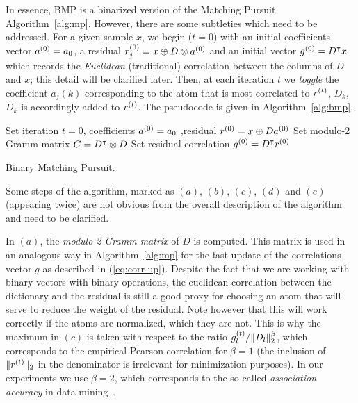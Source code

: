 \documentclass[twocolumn]{IEEEtran}
\theoremstyle{definition}
\def\transp{^\intercal}
\newcommand{\refeq}[1]{(\ref{#1})}
\begin{document}
In essence, BMP is a binarized version of the Matching Pursuit Algorithm~\ref{alg:mp}. However, there are some subtleties which need to be addressed. 
For a given sample $x$, we begin ($t=0$) with an initial coefficients vector $a^{(0)}=a_0$, a residual $r^{(0)}_j=x \oplus D \otimes a^{(0)}$ and an initial vector $g\iter{0}=D\transp x$ which records the \emph{Euclidean} (traditional)  correlation between the columns of $D$ and $x$; this detail will be clarified later. Then, at each iteration $t$ we \emph{toggle} the coefficient $a_j(k)$ corresponding to the atom that is most correlated to $r^{(t)}$, $D_{k}$, $D_k$ is accordingly added to $r^{(t)}$. The pseudocode is given in Algorithm~\ref{alg:bmp}. 
%
\begin{algorithm}[ht]
Set iteration $t=0$, coefficients $a^{(0)}=a_0$ ,residual $r^{(0)}=x \oplus Da^{(0)}$\;
Set modulo-2 Gramm matrix $G = D\transp \mprod D$
Set residual correlation $g\iter{0}=D\transp{r\iter{0}}$
\caption{\label{alg:bmp} Binary Matching Pursuit.}
\end{algorithm}

Some steps of the algorithm, marked as $(a)$, $(b)$, $(c)$, $(d)$ and $(e)$ (appearing twice) are not obvious from the overall description of the algorithm and need to be clarified. 

In $(a)$, the \emph{modulo-2 Gramm matrix} of $D$ is computed. This matrix is used in an analogous way in Algorithm~\ref{alg:mp} for the fast update of the correlations vector $g$ as described in \refeq{eq:corr-up}. Despite the fact that we are working with binary vectors with binary operations, the euclidean correlation between the dictionary and the residual is still a good proxy for choosing an atom that will serve to reduce the weight of the residual. Note however that this will work correctly if the atoms are normalized, which they are not. This is why 
the maximum in $(c)$ is taken with respect to the ratio $g^{(t)}_l / \|D_l\|_2^\beta$, which corresponds to the empirical Pearson correlation for $\beta=1$ (the inclusion of $\|r^{(t)}\|_2$ in the denominator is irrelevant for minimization purposes). In our experiments we use $\beta=2$, which corresponds to the so called \emph{association accuracy} in data mining~\cite{association-accuracy}. 
\end{document}
